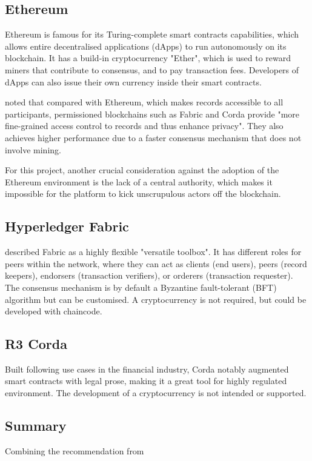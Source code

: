 \subsection*{Ethereum}

Ethereum is famous for its Turing-complete smart contracts capabilities, which allows entire 
decentralised applications (dApps) to run autonomously on its blockchain. It has a build-in cryptocurrency 
"Ether", which is used to reward miners that contribute to consensus, and to pay transaction fees. 
Developers of dApps can also issue their own currency inside their smart contracts.

\citet[p.3-4]{valenta2017comparison} noted that compared with Ethereum, which makes records accessible 
to all participants, permissioned blockchains such as Fabric and Corda provide "more fine-grained access 
control to records and thus enhance privacy". 
They also achieves higher performance due to a faster consensus mechanism that does not involve mining.

For this project, another crucial consideration against the adoption of the Ethereum environment is the 
lack of a central authority, which makes it impossible for the platform to kick unscrupulous actors off 
the blockchain.

\subsection*{Hyperledger Fabric}

\citet[p.7]{valenta2017comparison} described Fabric as a highly flexible "versatile toolbox". It 
has different roles for peers within the network, where they can act as clients (end users), peers 
(record keepers), endorsers (transaction verifiers), or orderers (transaction requester). The 
consensus mechanism is by default a Byzantine fault-tolerant (BFT) algorithm but can be customised. 
A cryptocurrency is not required, but could be developed with chaincode.

\subsection*{R3 Corda}

Built following use cases in the financial industry, Corda notably augmented smart contracts 
with legal prose, making it a great tool for highly regulated environment. The development of 
a cryptocurrency is not intended or supported. \citep{valenta2017comparison}

\subsection*{Summary}

Combining the recommendation from 


